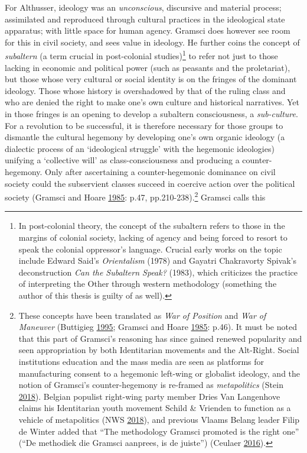\documentclass[10pt,british,A4paper,,openany]{memoir}
\begin{document}
For Althusser, ideology was an \emph{unconscious}, discursive and
material process; assimilated and reproduced through cultural practices
in the ideological state apparatus; with little space for human agency.
Gramsci does however see room for this in civil society, and sees value
in ideology. He further coins the concept of \emph{subaltern} (a term
crucial in post-colonial studies)\footnote{In post-colonial theory, the
  concept of the subaltern refers to those in the margins of colonial
  society, lacking of agency and being forced to resort to speak the
  colonial oppressor's language. Crucial early works on the topic
  include Edward Said's \emph{Orientalism} (1978) and Gayatri
  Chakravorty Spivak's deconstruction \emph{Can the Subaltern Speak?}
  (1983), which criticizes the practice of interpreting the Other
  through western methodology (something the author of this thesis is
  guilty of as well).} to refer not just to those lacking in economic
and political power (such as peasants and the proletariat), but those
whose very cultural or social identity is on the fringes of the dominant
ideology. Those whose history is overshadowed by that of the ruling
class and who are denied the right to make one's own culture and
historical narratives. Yet in those fringes is an opening to develop a
subaltern consciousness, a \emph{sub-culture}. For a revolution to be
successful, it is therefore necessary for those groups to dismantle the
cultural hegemony by developing one's own organic ideology (a dialectic
process of an `ideological struggle' with the hegemonic ideologies)
unifying a `collective will' as class-consciousness and producing a
counter-hegemony. Only after ascertaining a counter-hegemonic dominance
on civil society could the subservient classes succeed in coercive
action over the political society (Gramsci and Hoare
\protect\hyperlink{ref-gramsci_selections_1985}{1985}: p.47,
pp.210-238).\footnote{These concepts have been translated as \emph{War
  of Position} and \emph{War of Maneuver} (Buttigieg
  \protect\hyperlink{ref-buttigieg_gramsci_1995}{1995}; Gramsci and
  Hoare \protect\hyperlink{ref-gramsci_selections_1985}{1985}: p.46). It
  must be noted that this part of Gramsci's reasoning has since gained
  renewed popularity and seen appropriation by both Identitarian
  movements and the Alt-Right. Social institutions education and the
  mass media are seen as platforms for manufacturing consent to a
  hegemonic left-wing or globalist ideology, and the notion of Gramsci's
  counter-hegemony is re-framed as \emph{metapolitics} (Stein
  \protect\hyperlink{ref-stein_jeff_2018}{2018}). Belgian populist
  right-wing party member Dries Van Langenhove claims his Identitarian
  youth movement Schild \& Vrienden to function as a vehicle of
  metapolitics (NWS \protect\hyperlink{ref-nws_van_2018}{2018}), and
  previous Vlaams Belang leader Filip de Winter added that ``The
  methodology Gramsci promoted is the right one'' (``De methodiek die
  Gramsci aanprees, is de juiste'') (Ceulaer
  \protect\hyperlink{ref-ceulaer_6_2016}{2016}).} Gramsci calls this
\end{document}
